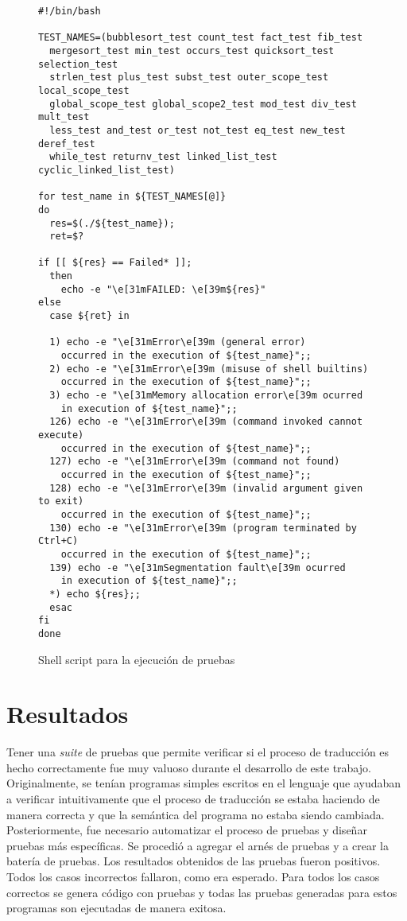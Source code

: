 \begin{figure}
\begin{lstlisting}
#!/bin/bash

TEST_NAMES=(bubblesort_test count_test fact_test fib_test
  mergesort_test min_test occurs_test quicksort_test selection_test
  strlen_test plus_test subst_test outer_scope_test local_scope_test
  global_scope_test global_scope2_test mod_test div_test mult_test
  less_test and_test or_test not_test eq_test new_test deref_test
  while_test returnv_test linked_list_test cyclic_linked_list_test)

for test_name in ${TEST_NAMES[@]}
do
  res=$(./${test_name});
  ret=$?

if [[ ${res} == Failed* ]];
  then
    echo -e "\e[31mFAILED: \e[39m${res}"
else
  case ${ret} in

  1) echo -e "\e[31mError\e[39m (general error)
    occurred in the execution of ${test_name}";;
  2) echo -e "\e[31mError\e[39m (misuse of shell builtins)
    occurred in the execution of ${test_name}";;
  3) echo -e "\e[31mMemory allocation error\e[39m ocurred
    in execution of ${test_name}";;
  126) echo -e "\e[31mError\e[39m (command invoked cannot execute)
    occurred in the execution of ${test_name}";;
  127) echo -e "\e[31mError\e[39m (command not found)
    occurred in the execution of ${test_name}";;
  128) echo -e "\e[31mError\e[39m (invalid argument given to exit)
    occurred in the execution of ${test_name}";;
  130) echo -e "\e[31mError\e[39m (program terminated by Ctrl+C)
    occurred in the execution of ${test_name}";;
  139) echo -e "\e[31mSegmentation fault\e[39m ocurred
    in execution of ${test_name}";;
  *) echo ${res};;
  esac
fi
done
\end{lstlisting}

\caption{Shell script para la ejecución de pruebas}
\label{fig:bash_script}
\end{figure}

\section{Resultados}\label{section:results}

Tener una \textit{suite} de pruebas que permite verificar si el proceso de traducción es hecho correctamente fue muy valuoso durante el desarrollo de este trabajo.
Originalmente, se tenían programas simples escritos en el lenguaje que ayudaban a verificar intuitivamente que el proceso de traducción se estaba haciendo de manera correcta y que la semántica del programa no estaba siendo cambiada.
Posteriormente, fue necesario automatizar el proceso de pruebas y diseñar pruebas más específicas.
Se procedió a agregar el arnés de pruebas y a crear la batería de pruebas.
Los resultados obtenidos de las pruebas fueron positivos.
Todos los casos incorrectos fallaron, como era esperado.
Para todos los casos correctos se genera código con pruebas y todas las pruebas generadas para estos programas son ejecutadas de manera exitosa.

